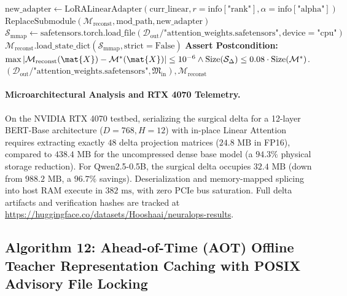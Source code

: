 \begin{algorithm}[H]
\begin{algorithmic}[1]
        \STATE $\text{new\_adapter} \leftarrow \text{LoRALinearAdapter}(\text{curr\_linear}, r=\text{info}[\text{"rank"}], \alpha=\text{info}[\text{"alpha"}])$
        \STATE $\text{ReplaceSubmodule}(\mathcal{M}_{\text{reconst}}, \text{mod\_path}, \text{new\_adapter})$
    \ENDIF
\ENDFOR
\STATE $\mathcal{S}_{\text{mmap}} \leftarrow \text{safetensors.torch.load\_file}(\mathcal{D}_{\text{out}} / \text{"attention\_weights.safetensors"}, \text{device}=\text{"cpu"})$
\STATE $\mathcal{M}_{\text{reconst}}.\text{load\_state\_dict}(\mathcal{S}_{\text{mmap}}, \text{strict}=\text{False})$ 
\STATE \textbf{Assert Postcondition:} $\max |\mathcal{M}_{\text{reconst}}(\mat{X}) - \mathcal{M}^*(\mat{X})| \le 10^{-6} \land \text{Size}(\mathcal{S}_{\Delta}) \le 0.08 \cdot \text{Size}(\mathcal{M}^*)$.
\RETURN $(\mathcal{D}_{\text{out}} / \text{"attention\_weights.safetensors"}, \mathfrak{M}_{\text{in}}), \mathcal{M}_{\text{reconst}}$
\end{algorithmic}
\end{algorithm}

\paragraph{Microarchitectural Analysis and RTX 4070 Telemetry.}
On the NVIDIA RTX 4070 testbed, serializing the surgical delta for a 12-layer BERT-Base architecture ($D=768, H=12$) with in-place Linear Attention requires extracting exactly $48$ delta projection matrices ($24.8\text{ MB}$ in FP16), compared to $438.4\text{ MB}$ for the uncompressed dense base model (a $94.3\%$ physical storage reduction). For Qwen2.5-0.5B, the surgical delta occupies $32.4\text{ MB}$ (down from $988.2\text{ MB}$, a $96.7\%$ savings). Deserialization and memory-mapped splicing into host RAM execute in $382\text{ ms}$, with zero PCIe bus saturation. Full delta artifacts and verification hashes are tracked at \url{https://huggingface.co/datasets/Hooshaai/neuralops-results}.

\subsection{Algorithm 12: Ahead-of-Time (AOT) Offline Teacher Representation Caching with POSIX Advisory File Locking}
\label{subsec:alg_teacher_cache_posix}

